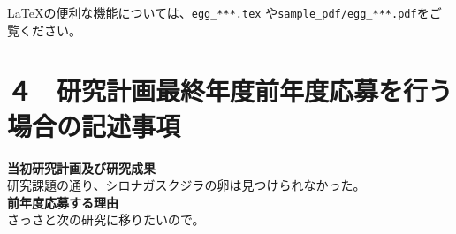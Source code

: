 \documentclass[11pt,a4j,dvipdfmx]{jarticle} 					%
\newcommand{\研究課題名}{象の卵}
\newcommand{\研究機関名}{逢坂大学}
\newcommand{\研究代表者氏名}{湯川秀樹}
\newcommand{\研究期間の最終元号年度}{9}  %
\begin{document}
	\LaTeX の便利な機能については、\texttt{egg\_***.tex} や\texttt{sample\_pdf/egg\_***.pdf}をご覧ください。




\section{４　研究計画最終年度前年度応募を行う場合の記述事項}

\newcommand{\最終年度研究種目名}{基盤研究（Z）}
\newcommand{\最終年度研究課題番号}{99999}
\newcommand{\最終年度研究課題名}{シロナガスクジラの卵はなぜ見つけられないのか}
\newcommand{\最終年度研究期間}{平成25年度〜令和\一年目 年度}


\noindent
\textbf{当初研究計画及び研究成果}\\
	研究課題の通り、シロナガスクジラの卵は見つけられなかった。
\\

\noindent
\textbf{前年度応募する理由}\\
	さっさと次の研究に移りたいので。



\end{document}
